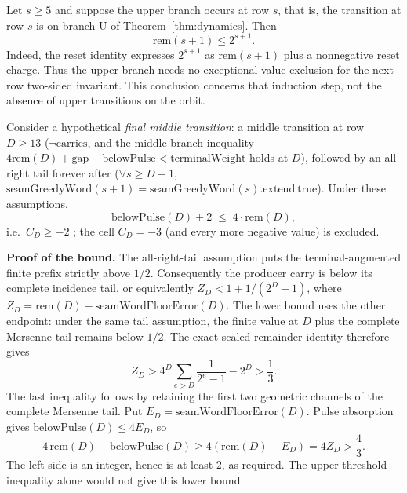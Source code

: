 \begin{prop}
\label{prop:upper-unconditional}
Let $s\ge5$ and suppose the upper branch occurs at row $s$, that is,
the transition at row $s$ is on branch $\mathrm U$ of Theorem~\ref{thm:dynamics}.
Then
\[
  \mathrm{rem}(s+1)\le2^{s+1}.
\]
Indeed, the reset identity expresses $2^{s+1}$ as
$\mathrm{rem}(s+1)$ plus a nonnegative reset charge.
Thus the upper branch needs no exceptional-value exclusion for the
next-row two-sided invariant.  This conclusion concerns that induction
step, not the absence of upper transitions on the orbit.
\end{prop}

\begin{thm}[$C_D=-3$ is impossible at the final middle transition, $D\ge 13$]
\label{thm:cd-neg3-impossible}
Consider a hypothetical \emph{final middle transition}: a middle transition at row $D\ge 13$
($\lnot\mathrm{carries}$, and the middle-branch inequality
$4\mathrm{rem}(D)+\mathrm{gap}-\mathrm{belowPulse} < \mathrm{terminalWeight}$ holds at $D$), followed
by an all-right tail forever after ($\forall s\ge D{+}1$, $\mathrm{seamGreedyWord}(s+1) =
\mathrm{seamGreedyWord}(s).\mathrm{extend}\ \mathrm{true}$). Under these assumptions,
\[
  \mathrm{belowPulse}(D) + 2 \;\le\; 4\cdot\mathrm{rem}(D),
\]
i.e.\ $C_D \ge -2$ ;  the cell $C_D=-3$ (and every more negative value) is excluded.

\textbf{Proof of the bound.} The all-right-tail assumption puts the
terminal-augmented finite prefix strictly above $1/2$.
Consequently the producer carry is below its complete incidence tail,
or equivalently
$Z_D<1+1/(2^D-1)$, where
$Z_D=\mathrm{rem}(D)-\mathrm{seamWordFloorError}(D)$.
The lower bound uses the other endpoint: under the same tail assumption,
the finite value at $D$ plus the complete Mersenne tail remains below
$1/2$.  The exact scaled remainder identity therefore gives
\[
 Z_D>4^D\sum_{e>D}\frac1{2^e-1}-2^D>\frac13.
\]
The last inequality follows by retaining the first two geometric
channels of the complete Mersenne tail.  Put
$E_D=\mathrm{seamWordFloorError}(D)$.  Pulse absorption gives
$\mathrm{belowPulse}(D)\le4E_D$, so
\[
 4\,\mathrm{rem}(D)-\mathrm{belowPulse}(D)
 \ge4(\mathrm{rem}(D)-E_D)=4Z_D>\frac43.
\]
The left side is an integer, hence is at least $2$, as required.
The upper threshold inequality alone would not give this lower bound.


\end{thm}
